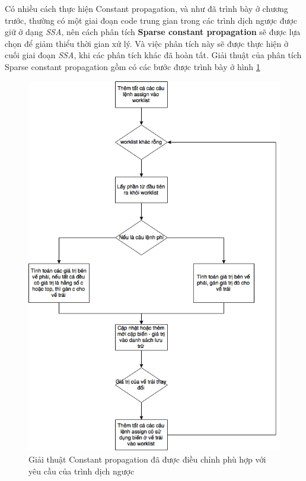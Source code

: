 Có nhiều cách thực hiện Constant propagation, và như đã trình bày ở chương trước, thường có một giai đoạn code trung gian trong các trình dịch ngược được giữ ở dạng \textit{SSA}, nên cách phân tích \textbf{Sparse constant propagation} sẽ được lựa chọn để giảm thiểu thời gian xử lý. Và việc phân tích này sẽ được thực hiện ở cuối giai đoạn \textit{SSA}, khi các phân tích khác đã hoàn tất. Giải thuật của phân tích Sparse constant propagation gồm có các bước được trình bày ở hình \ref{fig:constantpropagationalgo}

\begin{figure}
	\centering
	\includegraphics[scale=0.75]{image/constantPropagationAlgo}
	\caption{Giải thuật Constant propagation đã được điều chỉnh phù hợp với yêu cầu của trình dịch ngược}
	\label{fig:constantpropagationalgo}
\end{figure}

